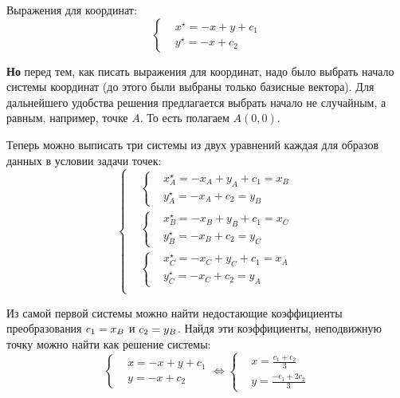 \documentclass[a4paper,12pt]{article}
\begin{document}
\begin{solution}
    Выражения для координат:
    \[
      \left\{
        \begin{aligned}
          &x^\star = -x + y + c_1\\
          &y^\star = -x + c_2
        \end{aligned}
      \right.
    \]
    
    \textbf{Но} перед тем, как писать выражения для координат, надо было выбрать начало системы координат (до этого были выбраны только базисные вектора).
    Для дальнейшего удобства решения предлагается выбрать начало не случайным, а равным, например, точке $A$.
    То есть полагаем $A(0, 0)$.
    
    Теперь можно выписать три системы из двух уравнений каждая для образов данных в условии задачи точек:
    \begin{equation}
      \label{eq:huge-system}
      \left\{
        \begin{aligned}
          &\left\{
            \begin{aligned}
              &x_A^\star = -x_A + y_A + c_1 = x_B\\
              &y_A^\star = -x_A + c_2 = y_B
            \end{aligned}
          \right.\\
          &\left\{
            \begin{aligned}
              &x_B^\star = -x_B + y_B + c_1 = x_C\\
              &y_B^\star = -x_B + c_2 = y_C
            \end{aligned}
          \right.\\
          &\left\{
            \begin{aligned}
              &x_C^\star = -x_C + y_C + c_1 = x_A\\
              &y_C^\star = -x_C + c_2 = y_A
            \end{aligned}
          \right.\\
        \end{aligned}
      \right.
    \end{equation}
    
    Из самой первой системы можно найти недостающие коэффициенты преобразования $c_1 \hm= x_B$ и $c_2 \hm= y_B$.
    Найдя эти коэффициенты, неподвижную точку можно найти как решение системы:
    \[
      \left\{
        \begin{aligned}
          &x = -x + y + c_1\\
          &y = -x + c_2
        \end{aligned}
      \right.
      \Leftrightarrow
      \left\{
        \begin{aligned}
          &x = \frac{c_1 + c_2}{3}\\
          &y = \frac{-c_1 + 2c_2}{3}
        \end{aligned}
      \right.
    \]
    

\end{solution}
\end{document}
